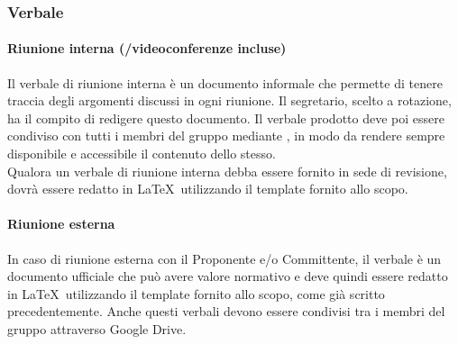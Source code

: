 \documentclass[../NormeDiProgetto.tex]{subfiles}
\begin{document}
			\subsubsection{Verbale}
					\paragraph{Riunione interna (/videoconferenze incluse)\\}
						Il verbale di riunione interna è un documento informale che permette di tenere traccia
						degli argomenti discussi in ogni riunione. Il segretario, scelto a rotazione, ha il
						compito di redigere questo documento. Il verbale prodotto deve poi essere condiviso
						con tutti i membri del gruppo mediante , in modo da rendere sempre
						disponibile e accessibile il contenuto dello stesso.\\
						Qualora un verbale di riunione interna debba essere fornito in sede di revisione,
						dovrà essere redatto in \LaTeX\ utilizzando il template fornito allo scopo.
					\paragraph{Riunione esterna\\}
						In caso di riunione esterna con il Proponente e/o Committente, il verbale è un
						documento ufficiale che può avere valore normativo e deve quindi essere redatto
						in \LaTeX\ utilizzando il template fornito allo scopo, come già scritto precedentemente.
						Anche questi verbali devono essere condivisi tra i membri del gruppo
						attraverso Google Drive.
\end{document}

